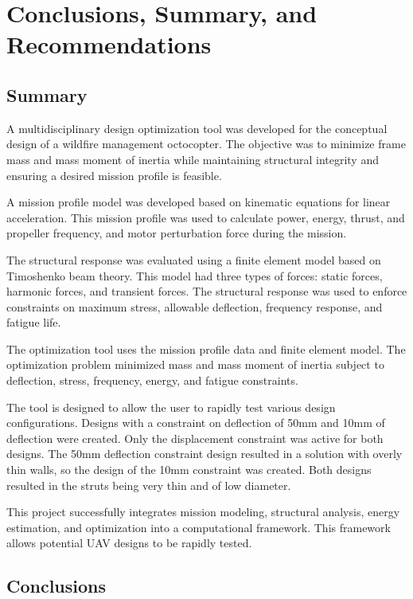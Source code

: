 \documentclass[doublespace,nopageskip]{VTthesis}
\begin{document}
{	\chapter{Conclusions, Summary, and Recommendations} \label{ch:fin}
		
		\section{Summary} \label{se:summary}
		
		A multidisciplinary design optimization tool was developed for the conceptual design of a wildfire management octocopter. The objective was to minimize frame mass and mass moment of inertia while maintaining structural integrity and ensuring a desired mission profile is feasible.
	
		A mission profile model was developed based on kinematic equations for linear acceleration. This mission profile was used to calculate power, energy, thrust, and propeller frequency, and motor perturbation force during the mission. 
		
		The structural response was evaluated using a finite element model based on Timoshenko beam theory. This model had three types of forces: static forces, harmonic forces, and transient forces. The structural response was used to enforce constraints on maximum stress, allowable deflection, frequency response, and fatigue life.
		
		The optimization tool uses the mission profile data and finite element model. The optimization problem minimized mass and mass moment of inertia subject to deflection, stress, frequency, energy, and fatigue constraints.
		
		The tool is designed to allow the user to rapidly test various design configurations. Designs with a constraint on deflection of 50mm and 10mm of deflection were created. Only the displacement constraint was active for both designs. The 50mm deflection constraint design resulted in a solution with overly thin walls, so the design of the 10mm constraint was created. Both designs resulted in the struts being very thin and of low diameter. 
		
		This project successfully integrates mission modeling, structural analysis, energy estimation, and optimization into a computational framework. This framework allows potential UAV designs to be rapidly tested. 
	
		  
		
		\section{Conclusions}
		
}
\end{document}
